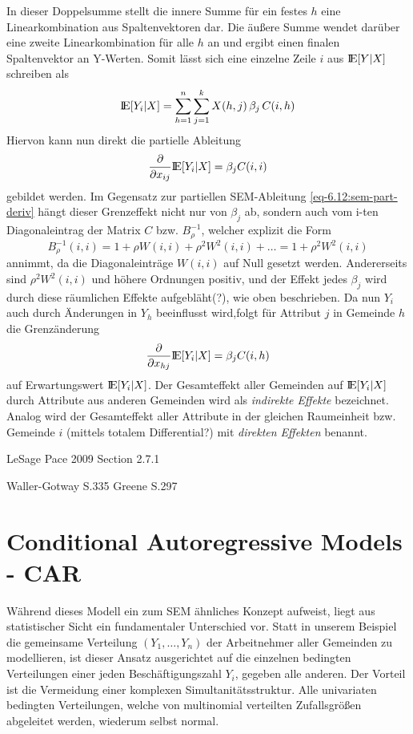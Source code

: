 In dieser Doppelsumme stellt die innere Summe für ein festes $h$ eine Linearkombination 
aus Spaltenvektoren dar. Die äußere Summe wendet darüber eine zweite Linearkombination 
für alle $h$ an und ergibt einen finalen Spaltenvektor an Y-Werten. Somit lässt sich eine 
einzelne Zeile $i$ aus $ {\rm I\!E}[Y|X]$ schreiben als
\begin{equation*}
    {\rm I\!E}[Y_{i}|X] = \sum_{h=1}^{n} \sum_{j=1}^{k}  X(h,j) \, \beta_{j} \, C(i,h)
\end{equation*}
Hiervon kann nun direkt die partielle Ableitung
\begin{equation*}
    \frac{\partial}{\partial x_{ij}} {\rm I\!E}[Y_{i}|X] = \beta_{j} C(i,i)
\end{equation*}
gebildet werden. Im Gegensatz zur partiellen SEM-Ableitung \eqref{eq-6.12:sem-part-deriv} hängt 
dieser Grenzeffekt nicht nur von $\beta_{j}$ ab, sondern 
auch vom i-ten Diagonaleintrag der Matrix $C$ bzw. $B_{\rho}^{-1}$, welcher explizit die Form
\begin{equation*}
    B_{\rho}^{-1}(i,i) = 1 + \rho W(i,i) + \rho^{2} W^{2}(i,i) + \ldots = 1 + \rho^{2} W^{2}(i,i)
\end{equation*}
annimmt, da die Diagonaleinträge $W(i,i)$ auf Null gesetzt werden. Andererseits 
sind $\rho^{2} W^{2}(i,i)$ und höhere Ordnungen positiv, und der Effekt jedes $\beta_{j}$ wird 
durch diese räumlichen Effekte aufgebläht(?), wie oben beschrieben. 
Da nun $Y_{i}$ auch durch Änderungen in $Y_{h}$ beeinflusst wird,folgt für 
Attribut $j$ in Gemeinde $h$ die Grenzänderung
\begin{equation*}
    \frac{\partial}{\partial x_{hj}} {\rm I\!E}[Y_{i}|X] = \beta_{j} C(i,h)
\end{equation*}
auf Erwartungswert ${\rm I\!E}[Y_{i}|X]$. Der Gesamteffekt aller Gemeinden auf ${\rm I\!E}[Y_{i}|X]$ 
durch Attribute aus anderen Gemeinden wird als \emph{indirekte Effekte} bezeichnet. 
Analog wird der Gesamteffekt aller Attribute in der gleichen 
Raumeinheit bzw. Gemeinde $i$ (mittels totalem Differential?) mit \emph{direkten Effekten} benannt.

LeSage Pace 2009 Section 2.7.1
 
Waller-Gotway S.335
Greene S.297


\section{Conditional Autoregressive Models - CAR}

Während dieses Modell ein zum SEM ähnliches Konzept aufweist, liegt aus statistischer 
Sicht ein fundamentaler Unterschied vor. Statt in unserem Beispiel die gemeinsame 
Verteilung $(Y_{1},\ldots,Y_{n})$ der Arbeitnehmer aller Gemeinden zu modellieren, ist 
dieser Ansatz ausgerichtet auf die einzelnen bedingten Verteilungen einer jeden 
Beschäftigungszahl $Y_{i}$, gegeben alle anderen. Der Vorteil ist die Vermeidung einer 
komplexen Simultanitätsstruktur. Alle univariaten bedingten Verteilungen, welche von 
multinomial verteilten Zufallsgrößen abgeleitet werden, wiederum selbst normal.


